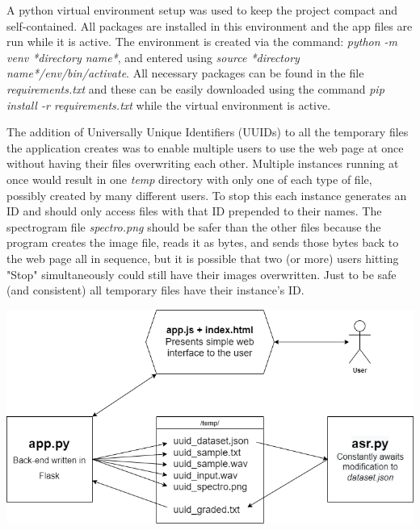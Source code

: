 \documentclass[12pt, letterpaper]{article}
\begin{document}
A python virtual environment setup was used to keep the project compact and self-contained. All packages are installed in this environment and the app files are run while it is active. The environment is created via the command: \textit{python -m venv *directory name*}, and entered using \textit{source *directory name*/env/bin/activate}. All necessary packages can be found in the file \textit{requirements.txt} and these can be easily downloaded using the command \textit{pip install -r requirements.txt} while the virtual environment is active.

The addition of Universally Unique Identifiers (UUIDs) to all the temporary files the application creates was to enable multiple users to use the web page at once without having their files overwriting each other. Multiple instances running at once would result in one \textit{temp} directory with only one of each type of file, possibly created by many different users. To stop this each instance generates an ID and should only access files with that ID prepended to their names. The spectrogram file \textit{spectro.png} should be safer than the other files because the program creates the image file, reads it as bytes, and sends those bytes back to the web page all in sequence, but it is possible that two (or more) users hitting "Stop" simultaneously could still have their images overwritten. Just to be safe  (and consistent) all temporary files have their instance's ID.

\includegraphics[scale=0.6]{images/workflow.png}

\newpage%
\end{document}
